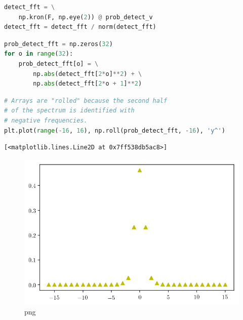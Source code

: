 \begin{lstlisting}[language=Python]
detect_fft = \
    np.kron(F, np.eye(2)) @ prob_detect_v
detect_fft = detect_fft / norm(detect_fft)
\end{lstlisting}

\begin{lstlisting}[language=Python]
prob_detect_fft = np.zeros(32)
for o in range(32):
    prob_detect_fft[o] = \
        np.abs(detect_fft[2*o]**2) + \
        np.abs(detect_fft[2*o + 1]**2) 
\end{lstlisting}

\begin{lstlisting}[language=Python]
# Arrays are "rolled" because the second half 
# of the spectrum is identified with
# negative frequencies.
plt.plot(range(-16, 16), np.roll(prob_detect_fft, -16), 'y^')
\end{lstlisting}

\begin{lstlisting}
[<matplotlib.lines.Line2D at 0x7ff538db5ac8>]
\end{lstlisting}

\begin{figure}
\centering
\includegraphics[width=0.6\linewidth]{output_102_1.png}
\caption[]{png}
\end{figure}




